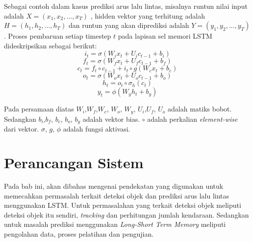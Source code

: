 \documentclass[conference]{IEEEtran}
\begin{document}
Sebagai contoh dalam kasus prediksi arus lalu lintas, misalnya runtun nilai input adalah $X = (x_{1},x_{2},...,x_{T})$ , hidden vektor yang terhitung adalah $H = (h_{1},h_{2},...,h_{T})$ dan runtun yang akan diprediksi adalah $Y = (y_{1},y_{2},...,y_{T})$. 
Proses pembaruan setiap timestep $t$ pada lapisan sel memori LSTM dideskripsikan sebagai berikut:
\begin{equation} \label{input_gate}
 i_{t} = \sigma(W_{i}x_{t} + U_{i}c_{t-1}+b_{i})
\end{equation}
\begin{equation} \label{forget_gate}
	f_{t} = \sigma(W_{f}x_{t} + U_{f}c_{t-1}+b_{f})
\end{equation}
\begin{equation} \label{cell_state}
	c_{t} = f_{t}\circ c_{t-1} + i_{t}\circ g(W_{c}x_{t}+b_{c})
\end{equation}
\begin{equation} \label{output_gate}
	o_{t} = \sigma(W_{o}x_{t} + U_{o}c_{t-1}+b_{o})
\end{equation}
\begin{equation} \label{hidden_state}
	h_{t} = o_{t} \circ \sigma_{h}(c_{t})
\end{equation}
\begin{equation} \label{result_gate}
	y_{t} = \phi(W_{y}h_{t} + b_{y})
\end{equation}

Pada persamaan diatas $W_{i}$,$W_{f}$,$W_{c}$, $W_{o}$, $W_{y}$, $U_{i}$,$U_{f}$, $U_{o}$ adalah matiks bobot. Sedangkan $b_{i}$,$b_{f}$, $b_{c}$, $b_{o}$, $b_{y}$ adalah vektor bias.
$\circ$ adalah perkalian \textit{element-wise} dari vektor. $\sigma$, $g$, $\phi$ adalah fungsi aktivasi.

\section{Perancangan Sistem}
Pada bab ini, akan dibahas mengenai pendekatan yang digunakan untuk memecahkan permasalah terkait deteksi objek dan prediksi arus lalu lintas menggunakan LSTM. Untuk permasalahan yang terkait deteksi objek meliputi deteksi objek itu sendiri, \textit{tracking} dan perhitungan jumlah kendaraan. Sedangkan
untuk masalah prediksi menggunakan \textit{Long-Short Term Memory} meliputi pengolahan data, proses pelatihan dan pengujian.
\end{document}
